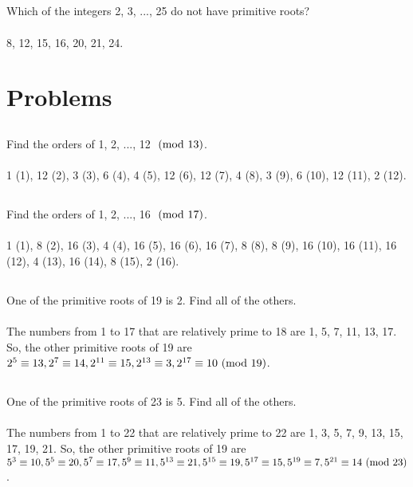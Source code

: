\documentclass{article} \usepackage{amsmath}
\begin{document}
\subsection{}
Which of the integers 2, 3, ..., 25 do not have primitive roots?\\~\\
8, 12, 15, 16, 20, 21, 24.

\section{Problems}

\subsection{}
Find the orders of 1, 2, ..., 12 $\ (\mathrm{mod}\ 13)$.\\~\\
1 (1), 12 (2), 3 (3), 6 (4), 4 (5), 12 (6), 12 (7), 4 (8), 3 (9), 6 (10),
12 (11), 2 (12).

\subsection{}
Find the orders of 1, 2, ..., 16 $\ (\mathrm{mod}\ 17)$.\\~\\
1 (1), 8 (2), 16 (3), 4 (4), 16 (5), 16 (6), 16 (7), 8 (8), 8 (9),
16 (10), 16 (11), 16 (12), 4 (13), 16 (14), 8 (15), 2 (16).

\subsection{}
One of the primitive roots of 19 is 2. Find all of the others.\\~\\
The numbers from 1 to 17 that are relatively prime to 18 are
1, 5, 7, 11, 13, 17.
So, the other primitive roots of 19 are $2^5 \equiv 13, 2^7 \equiv 14,
2^{11} \equiv 15, 2^{13} \equiv 3, 2^{17} \equiv 10 \ (\mathrm{mod}\ 19)$.

\subsection{}
One of the primitive roots of 23 is 5. Find all of the others.\\~\\
The numbers from 1 to 22 that are relatively prime to 22 are
1, 3, 5, 7, 9, 13, 15, 17, 19, 21.
So, the other primitive roots of 19 are $5^3 \equiv 10, 5^5 \equiv 20,
5^7 \equiv 17, 5^{9} \equiv 11, 5^{13} \equiv 21, 5^{15} \equiv 19,
5^{17} \equiv 15, 5^{19} \equiv 7, 5^{21} \equiv 14 \ (\mathrm{mod}\ 23)$.
\end{document}
